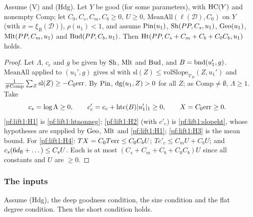 \begin{proposition}\label{pf:lift1:heightpt}
Assume (V) and (Hdg). Let $Y$ be good (for some parameters), with $\mathrm{HC}(Y)$ and nonempty
$\mathrm{Comp}$; let $C_0,C_s,C_m,C_b\ge0$, $U\ge0$, $\mathrm{MeanAll}(\ell(\mathcal D),C_0)$ on $Y$ (with
$x=\xi_R(\mathcal D)$), $\rho(u_1)<1$, and assume $\mathrm{Pin}(u_1)$, $\mathrm{Sh}(PP,C_s,u_1)$,
$\mathrm{Geo}(u_1)$, $\mathrm{Mlt}(PP,C_m,u_1)$ and $\mathrm{Bud}(PP,C_b,u_1)$. Then
$\mathrm{Ht}(PP,C_s+C_m+C_b+C_0C_b,u_1)$ holds.
\end{proposition}

\begin{proof}
Let $\Lambda$, $c_c$ and $g$ be given by $\mathrm{Sh}$, $\mathrm{Mlt}$ and $\mathrm{Bud}$, and
$B=\mathrm{bnd}(u_1',g)$. $\mathrm{MeanAll}$ applied to $(u_1',g)$ gives $\mathrm{sl}$ with
$\mathrm{sl}(Z)\le\mathrm{volSlope}_{\mathcal V_B}(Z,u_1')$ and
$\frac1{\#\mathrm{Comp}}\sum_Z\mathrm{sl}(Z)\ge-C_0\mathrm{err}$. By $\mathrm{Pin}$,
$\mathrm{dg}(u_1,Z)>0$ for all $Z$; as $\mathrm{Comp}\ne\emptyset$, $\Lambda\ge1$. Take
\[
c_s=\log\Lambda\ge0,\qquad c'_c=c_c+\mathrm{htc}(B)|u_1'|_1\ge0,\qquad X=C_0\mathrm{err}\ge0 .
\]
\ref{pf:lift1:H1} is \cref{pf:lift1:htnonneg}; \ref{pf:lift1:H2} (with $c'_c$) is \cref{pf:lift1:slopeht},
whose hypotheses are supplied by $\mathrm{Geo}$, $\mathrm{Mlt}$ and \ref{pf:lift1:H1};
\ref{pf:lift1:H3} is the mean bound. For \ref{pf:lift1:H4}: $TX=C_0T\mathrm{err}\le C_0C_bU$;
$Tc'_c\le C_mU+C_bU$; and $c_s(6d_{\mathrm{fl}}+\dots)\le C_sU$. Each is at most
$(C_s+C_m+C_b+C_0C_b)U$ since all constants and $U$ are $\ge0$.
\end{proof}

\subsubsection*{The inputs}

\begin{lemma}\label{pf:lift1:short}
Assume (Hdg), the deep goodness condition, the size condition and the flat degree
condition. Then the short condition holds.
\end{lemma}

